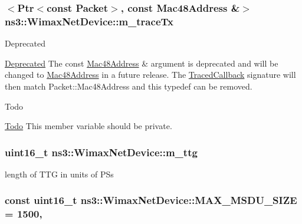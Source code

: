 \subsubsection[{\texorpdfstring{m\+\_\+trace\+Tx}{m_traceTx}}]{$<${\bf Ptr}$<$const {\bf Packet}$>$, const {\bf Mac48\+Address} \&$>$ ns3\+::\+Wimax\+Net\+Device\+::m\+\_\+trace\+Tx}\hypertarget{classns3_1_1WimaxNetDevice_a8fcb2352790f8cc4b34adbb1a359fa97}{}\label{classns3_1_1WimaxNetDevice_a8fcb2352790f8cc4b34adbb1a359fa97}
\begin{DoxyRefDesc}{Deprecated}
\item[\hyperlink{deprecated__deprecated000045}{Deprecated}]The {\ttfamily const \hyperlink{classns3_1_1Mac48Address}{Mac48\+Address} \&} argument is deprecated and will be changed to {\ttfamily \hyperlink{classns3_1_1Mac48Address}{Mac48\+Address}} in a future release. The \hyperlink{classns3_1_1TracedCallback}{Traced\+Callback} signature will then match {\ttfamily Packet\+::\+Mac48\+Address} and this typedef can be removed. \end{DoxyRefDesc}
\begin{DoxyRefDesc}{Todo}
\item[\hyperlink{todo__todo000184}{Todo}]This member variable should be private. \end{DoxyRefDesc}
\subsubsection[{\texorpdfstring{m\+\_\+ttg}{m_ttg}}]{\setlength{\rightskip}{0pt plus 5cm}uint16\+\_\+t ns3\+::\+Wimax\+Net\+Device\+::m\+\_\+ttg\hspace{0.3cm}{\ttfamily [private]}}\hypertarget{classns3_1_1WimaxNetDevice_aaef4d81157125f55f12093b45eabdc93}{}\label{classns3_1_1WimaxNetDevice_aaef4d81157125f55f12093b45eabdc93}


length of T\+TG in units of P\+Ss 

\subsubsection[{\texorpdfstring{M\+A\+X\+\_\+\+M\+S\+D\+U\+\_\+\+S\+I\+ZE}{MAX_MSDU_SIZE}}]{\setlength{\rightskip}{0pt plus 5cm}const uint16\+\_\+t ns3\+::\+Wimax\+Net\+Device\+::\+M\+A\+X\+\_\+\+M\+S\+D\+U\+\_\+\+S\+I\+ZE = 1500\hspace{0.3cm}{\ttfamily [static]}, {\ttfamily [private]}}\hypertarget{classns3_1_1WimaxNetDevice_a4f1da5fb6800bef6601b6620b69ac794}{}\label{classns3_1_1WimaxNetDevice_a4f1da5fb6800bef6601b6620b69ac794}


